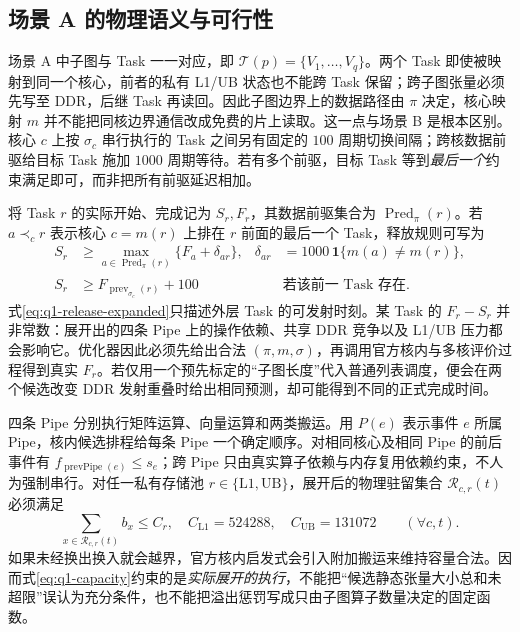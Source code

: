 \subsection{场景 A 的物理语义与可行性}
场景 A 中子图与 Task 一一对应，即 $\mathcal T(p)=\{V_1,\ldots,V_q\}$。两个 Task 即使被映射到同一个核心，前者的私有 L1/UB 状态也不能跨 Task 保留；跨子图张量必须先写至 DDR，后继 Task 再读回。因此子图边界上的数据路径由 $\pi$ 决定，核心映射 $m$ 并不能把同核边界通信改成免费的片上读取。这一点与场景 B 是根本区别。核心 $c$ 上按 $\sigma_c$ 串行执行的 Task 之间另有固定的 $100$ 周期切换间隔；跨核数据前驱给目标 Task 施加 $1000$ 周期等待。若有多个前驱，目标 Task 等到\emph{最后一个}约束满足即可，而非把所有前驱延迟相加。

将 Task $r$ 的实际开始、完成记为 $S_r,F_r$，其数据前驱集合为 $\operatorname{Pred}_{\pi}(r)$。若 $a\prec_c r$ 表示核心 $c=m(r)$ 上排在 $r$ 前面的最后一个 Task，释放规则可写为
\begin{align}\label{eq:q1-release-expanded}
S_r&\ge \max_{a\in\operatorname{Pred}_\pi(r)}
  \{F_a+\delta_{ar}\},&
\delta_{ar}&=1000\,\mathbf 1\{m(a)\ne m(r)\},\\
S_r&\ge F_{\operatorname{prev}_{\sigma_c}(r)}+100
&&\text{若该前一 Task 存在}.\nonumber
\end{align}
式\eqref{eq:q1-release-expanded}只描述外层 Task 的可发射时刻。某 Task 的 $F_r-S_r$ 并非常数：展开出的四条 Pipe 上的操作依赖、共享 DDR 竞争以及 L1/UB 压力都会影响它。优化器因此必须先给出合法 $(\pi,m,\sigma)$，再调用官方核内与多核评价过程得到真实 $F_r$。若仅用一个预先标定的“子图长度”代入普通列表调度，便会在两个候选改变 DDR 发射重叠时给出相同预测，却可能得到不同的正式完成时间。

四条 Pipe 分别执行矩阵运算、向量运算和两类搬运。用 $P(e)$ 表示事件 $e$ 所属 Pipe，核内候选排程给每条 Pipe 一个确定顺序。对相同核心及相同 Pipe 的前后事件有 $f_{\operatorname{prevPipe}(e)}\le s_e$；跨 Pipe 只由真实算子依赖与内存复用依赖约束，不人为强制串行。对任一私有存储池 $r\in\{\mathrm{L1},\mathrm{UB}\}$，展开后的物理驻留集合 $\mathcal R_{c,r}(t)$ 必须满足
\begin{equation}\label{eq:q1-capacity}
\sum_{x\in\mathcal R_{c,r}(t)} b_x\le C_r,\quad
C_{\mathrm{L1}}=524288,\quad C_{\mathrm{UB}}=131072
\qquad(\forall c,t).
\end{equation}
如果未经换出换入就会越界，官方核内启发式会引入附加搬运来维持容量合法。因而式\eqref{eq:q1-capacity}约束的是\emph{实际展开的执行}，不能把“候选静态张量大小总和未超限”误认为充分条件，也不能把溢出惩罚写成只由子图算子数量决定的固定函数。

